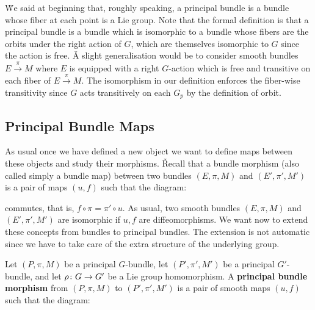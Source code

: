 \v

We said at beginning that, roughly speaking, a principal bundle is a bundle whose fiber at each point is a Lie group.
Note that the formal definition is that a principal bundle is a bundle which is isomorphic to a bundle whose fibers
are the orbits under the right action of $G$, which are themselves isomorphic to $G$ since the action is free. \v

A slight generalisation would be to consider smooth bundles $E\xrightarrow{\,\pi\,}M$ where $E$ is equipped with a
right $G$-action which is free and transitive on each fiber of $E\xrightarrow{\,\pi\,}M$. The isomorphism in our
definition enforces the fiber-wise transitivity since $G$ acts transitively on each $G_p$ by the definition of orbit.

\subsection{Principal Bundle Maps}

As usual once we have defined a new object we want to define maps between these objects and study their morphisms. \v

Recall that a bundle morphism (also called simply a bundle map) between two bundles $(E,\pi,M)$ and $(E',\pi',M')$ is
a pair of maps $(u,f)$ such that the diagram:
\bse
{}
\ese

commutes, that is, $f\circ \pi = \pi' \circ u$. As usual, two smooth bundles $(E,\pi,M)$ and $(E',\pi',M')$ are
isomorphic if $u,f$ are diffeomorphisms. We want now to extend these concepts from bundles to principal bundles. The
extension is not automatic since we have to take care of the extra structure of the underlying group.

Let $(P,\pi,M)$ be a principal $G$-bundle, let $(P',\pi',M')$ be a principal $G'$-bundle, and let $\rho\colon G \to G'$
be a Lie group homomorphism. A \textbf{principal bundle morphism} from $(P,\pi,M)$ to $ (P',\pi',M')$ is a pair of
smooth maps $(u,f)$ such that the diagram:
\bse
{}
\ese


